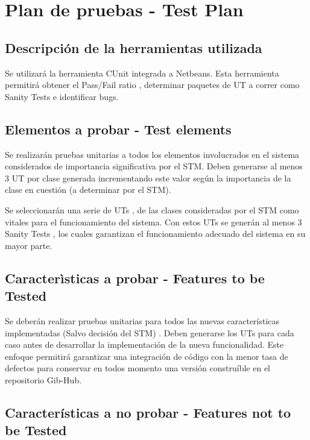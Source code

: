\newpage
\section{\textcolor[gray]{.2}{Plan de pruebas - Test Plan}}
\subsection{\textcolor[gray]{.2}{Descripción de la herramientas utilizada}}

Se utilizará la herramienta CUnit integrada a Netbeans. Esta herramienta permitirá obtener el Pass/Fail ratio , determinar paquetes de UT a correr como Sanity Tests e  identificar bugs.

\subsection{\textcolor[gray]{.2}{Elementos a probar - Test elements}}

Se realizarán pruebas unitarias a todos los elementos involucrados en el sistema considerados de importancia significativa por el STM. Deben generarse al menos 3 UT por clase generada incrementando este valor según la importancia de la clase en cuestión (a determinar por el STM).

	Se seleccionarán una serie de UTs , de las clases consideradas por el STM como vitales para el funcionamiento del sistema. Con estos UTs se generán al menos 3 Sanity Tests , los cuales garantizan el funcionamiento adecuado del sistema en su mayor parte.


\subsection{\textcolor[gray]{.2}{Caracterìsticas a probar - Features to be Tested}}

Se deberán realizar pruebas unitarias para todos las nuevas características implementadas (Salvo decisión del STM) . Deben generarse los UTs para cada caso antes de desarrollar la implementación de la nueva funcionalidad. Este enfoque permitirá garantizar una integración de código con la menor tasa de defectos para conservar en todos momento una versión construíble en el repositorio Gib-Hub.

\subsection{\textcolor[gray]{.2}{Características a no probar - Features not to be Tested }}

